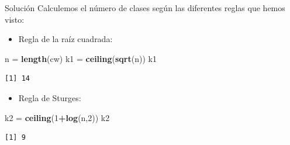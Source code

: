 \documentclass[
  ignorenonframetext,
  aspectratio=169]{beamer}
\newenvironment{Shaded}{\begin{snugshade}}{\end{snugshade}}
\newcommand{\DecValTok}[1]{\textcolor[rgb]{0.00,0.00,0.81}{#1}}
\newcommand{\FunctionTok}[1]{\textcolor[rgb]{0.13,0.29,0.53}{\textbf{#1}}}
\newcommand{\NormalTok}[1]{#1}
\newcommand{\OtherTok}[1]{\textcolor[rgb]{0.56,0.35,0.01}{#1}}
\newcommand{\SpecialCharTok}[1]{\textcolor[rgb]{0.81,0.36,0.00}{\textbf{#1}}}
\providecommand{\tightlist}{%
  \setlength{\itemsep}{0pt}\setlength{\parskip}{0pt}}
\begin{document}
\begin{frame}[fragile]{Solución}
\label{soluciuxf3n-1}
Calculemos el número de clases según las diferentes reglas que hemos
visto:

\begin{itemize}
\tightlist
\item
  Regla de la raíz cuadrada:
\end{itemize}

\begin{Shaded}
\begin{Highlighting}[]
\NormalTok{n }\OtherTok{=} \FunctionTok{length}\NormalTok{(cw)}
\NormalTok{k1 }\OtherTok{=} \FunctionTok{ceiling}\NormalTok{(}\FunctionTok{sqrt}\NormalTok{(n))}
\NormalTok{k1}
\end{Highlighting}
\end{Shaded}

\begin{verbatim}
[1] 14
\end{verbatim}

\begin{itemize}
\tightlist
\item
  Regla de Sturges:
\end{itemize}

\begin{Shaded}
\begin{Highlighting}[]
\NormalTok{k2 }\OtherTok{=} \FunctionTok{ceiling}\NormalTok{(}\DecValTok{1}\SpecialCharTok{+}\FunctionTok{log}\NormalTok{(n,}\DecValTok{2}\NormalTok{))}
\NormalTok{k2}
\end{Highlighting}
\end{Shaded}

\begin{verbatim}
[1] 9
\end{verbatim}
\end{frame}
\end{document}
